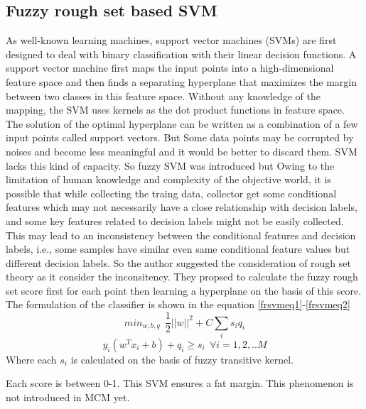 \subsection{Fuzzy rough set based SVM}\label{\FRSVMPaperReview}
As well-known learning machines, support vector machines (SVMs) are first designed to deal with binary classification with their linear decision functions. A support vector machine first maps the input points into a high-dimensional feature space and then finds a separating hyperplane that maximizes the margin between two classes in this feature space. Without any knowledge of the mapping, the SVM uses kernels as the dot product functions in feature space. The solution of the optimal hyperplane can be written as a combination of a few input points called support vectors. But Some data points may be corrupted by noises and become less meaningful and it would be better to discard them. SVM lacks this kind of capacity. So fuzzy SVM was introduced but Owing to the limitation of human knowledge and complexity of the objective world, it is possible that while collecting the traing data, collector get some conditional features which may not necessarily have a close relationship with decision labels, and some key features related to decision labels might not be easily collected. This may lead to an inconsistency between the conditional features and decision labels, i.e., some samples have similar even same conditional feature values but different decision labels. So the author \cite{FRSVM} suggested the consideration of rough set theory as it consider the inconsitency. They propsed to calculate the fuzzy rough set score first for each point then learning a hyperplane on the basis of this score. The formulation of the classifier is shown in the equation \ref{frsvmeq1}-\ref{frsvmeq2}
\begin{equation}\label{frsvmeq1}
min_{w,b,q}\:\: \frac{1}{2} ||w||^2 + C\sum_i{s_i q_i}
\end{equation}
\begin{equation}\label{frsvmeq2}
y_i(w^Tx_i +b) + q_i \geq s_i \:\:\forall i={1,2,.. M}
\end{equation}
Where each $s_i$ is calculated on the basis of fuzzy transitive kernel. 

Each score is between 0-1. This SVM ensures a fat margin. This phenomenon is not introduced in MCM yet.

